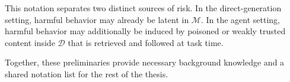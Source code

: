 This notation separates two distinct sources of risk.
In the direct-generation setting, harmful behavior may
already be latent in $\mathcal{M}$.
In the agent setting, harmful behavior may additionally be induced by
poisoned or weakly trusted content inside $\mathcal{D}$ that
is retrieved and followed at task time.

Together, these preliminaries provide necessary background knowledge
and a shared notation list for the rest of
 the thesis.
